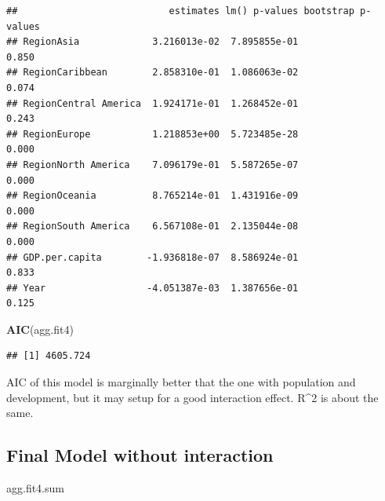 \documentclass[11pt,]{article}
\newenvironment{Shaded}{\begin{snugshade}}{\end{snugshade}}
\newcommand{\KeywordTok}[1]{\textcolor[rgb]{0.13,0.29,0.53}{\textbf{#1}}}
\newcommand{\NormalTok}[1]{#1}
\begin{document}
\begin{verbatim}
##                           estimates lm() p-values bootstrap p-values
## RegionAsia             3.216013e-02  7.895855e-01              0.850
## RegionCaribbean        2.858310e-01  1.086063e-02              0.074
## RegionCentral America  1.924171e-01  1.268452e-01              0.243
## RegionEurope           1.218853e+00  5.723485e-28              0.000
## RegionNorth America    7.096179e-01  5.587265e-07              0.000
## RegionOceania          8.765214e-01  1.431916e-09              0.000
## RegionSouth America    6.567108e-01  2.135044e-08              0.000
## GDP.per.capita        -1.936818e-07  8.586924e-01              0.833
## Year                  -4.051387e-03  1.387656e-01              0.125
\end{verbatim}

\begin{Shaded}
\begin{Highlighting}[]
\KeywordTok{AIC}\NormalTok{(agg.fit4)}
\end{Highlighting}
\end{Shaded}

\begin{verbatim}
## [1] 4605.724
\end{verbatim}

AIC of this model is marginally better that the one with population and
development, but it may setup for a good interaction effect. R\^{}2 is
about the same.

\hypertarget{final-model-without-interaction}{%
\subsection{Final Model without
interaction}\label{final-model-without-interaction}}

\begin{Shaded}
\begin{Highlighting}[]
\NormalTok{agg.fit4.sum}
\end{Highlighting}
\end{Shaded}
\end{document}
